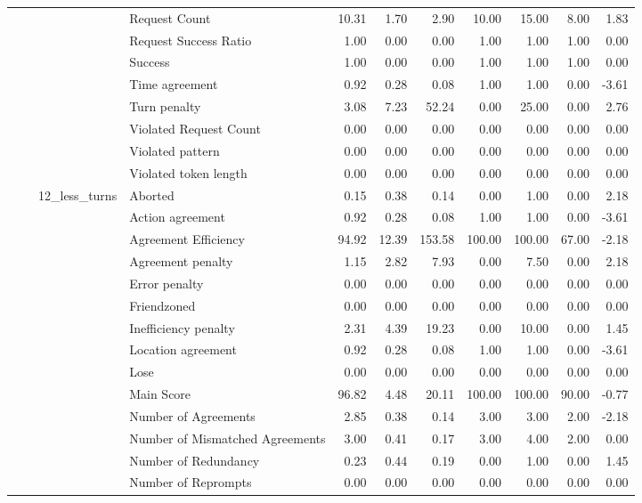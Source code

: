 \begin{tabular}{llllrrrrrrr}
 &  &  & Request Count & 10.31 & 1.70 & 2.90 & 10.00 & 15.00 & 8.00 & 1.83 \\
 &  &  & Request Success Ratio & 1.00 & 0.00 & 0.00 & 1.00 & 1.00 & 1.00 & 0.00 \\
 &  &  & Success & 1.00 & 0.00 & 0.00 & 1.00 & 1.00 & 1.00 & 0.00 \\
 &  &  & Time agreement & 0.92 & 0.28 & 0.08 & 1.00 & 1.00 & 0.00 & -3.61 \\
 &  &  & Turn penalty & 3.08 & 7.23 & 52.24 & 0.00 & 25.00 & 0.00 & 2.76 \\
 &  &  & Violated Request Count & 0.00 & 0.00 & 0.00 & 0.00 & 0.00 & 0.00 & 0.00 \\
 &  &  & Violated pattern & 0.00 & 0.00 & 0.00 & 0.00 & 0.00 & 0.00 & 0.00 \\
 &  &  & Violated token length & 0.00 & 0.00 & 0.00 & 0.00 & 0.00 & 0.00 & 0.00 \\
\cline{3-11}
 &  & \multirow[t]{27}{*}{12_less_turns} & Aborted & 0.15 & 0.38 & 0.14 & 0.00 & 1.00 & 0.00 & 2.18 \\
 &  &  & Action agreement & 0.92 & 0.28 & 0.08 & 1.00 & 1.00 & 0.00 & -3.61 \\
 &  &  & Agreement Efficiency & 94.92 & 12.39 & 153.58 & 100.00 & 100.00 & 67.00 & -2.18 \\
 &  &  & Agreement penalty & 1.15 & 2.82 & 7.93 & 0.00 & 7.50 & 0.00 & 2.18 \\
 &  &  & Error penalty & 0.00 & 0.00 & 0.00 & 0.00 & 0.00 & 0.00 & 0.00 \\
 &  &  & Friendzoned & 0.00 & 0.00 & 0.00 & 0.00 & 0.00 & 0.00 & 0.00 \\
 &  &  & Inefficiency penalty & 2.31 & 4.39 & 19.23 & 0.00 & 10.00 & 0.00 & 1.45 \\
 &  &  & Location agreement & 0.92 & 0.28 & 0.08 & 1.00 & 1.00 & 0.00 & -3.61 \\
 &  &  & Lose & 0.00 & 0.00 & 0.00 & 0.00 & 0.00 & 0.00 & 0.00 \\
 &  &  & Main Score & 96.82 & 4.48 & 20.11 & 100.00 & 100.00 & 90.00 & -0.77 \\
 &  &  & Number of Agreements & 2.85 & 0.38 & 0.14 & 3.00 & 3.00 & 2.00 & -2.18 \\
 &  &  & Number of Mismatched Agreements & 3.00 & 0.41 & 0.17 & 3.00 & 4.00 & 2.00 & 0.00 \\
 &  &  & Number of Redundancy & 0.23 & 0.44 & 0.19 & 0.00 & 1.00 & 0.00 & 1.45 \\
 &  &  & Number of Reprompts & 0.00 & 0.00 & 0.00 & 0.00 & 0.00 & 0.00 & 0.00 \\

\end{tabular}
